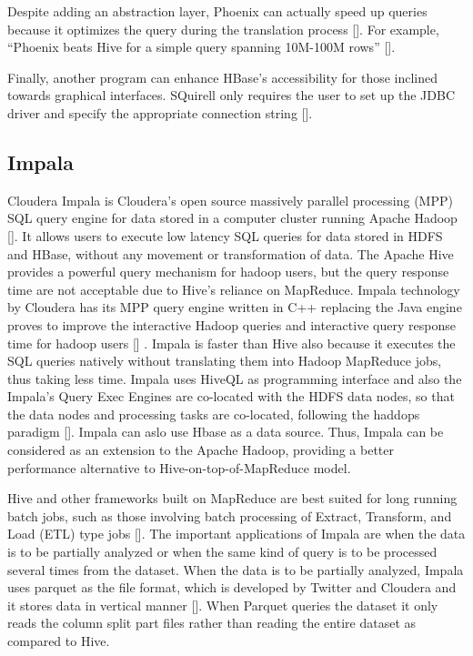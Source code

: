 Despite adding an abstraction layer, Phoenix can actually speed up
queries because it optimizes the query during the translation
process [\cite{www-phoenix-cloudera}]. For example, ``Phoenix beats Hive
for a simple query spanning 10M-100M rows'' [\cite{www-phoenix-infoq}].

Finally, another program can enhance HBase's accessibility for those
inclined towards graphical interfaces.  SQuirell only requires the
user to set up the JDBC driver and specify the appropriate connection
string [\cite{www-phoenix-bighadoop}].



\subsection{Impala}

Cloudera Impala is Cloudera's open source massively parallel
processing (MPP) SQL query engine for data stored in a computer
cluster running Apache Hadoop [\cite{www-impala-cloudera}]. It allows
users to execute low latency SQL queries for data stored in HDFS and
HBase, without any movement or transformation of data. The Apache Hive
provides a powerful query mechanism for hadoop users, but the query
response time are not acceptable due to Hive's reliance on
MapReduce. Impala technology by Cloudera has its MPP query engine
written in C++ replacing the Java engine proves to improve the
interactive Hadoop queries and interactive query response time for
hadoop users [\cite{www-impala-dummies}] . Impala is faster than Hive
also because it executes the SQL queries natively without translating
them into Hadoop MapReduce jobs, thus taking less time. Impala uses
HiveQL as programming interface and also the Impala's Query Exec
Engines are co-located with the HDFS data nodes, so that the data
nodes and processing tasks are co-located, following the haddops
paradigm [\cite{www-impala-dummies}].  Impala can aslo use Hbase as a
data source. Thus, Impala can be considered as an extension to the
Apache Hadoop, providing a better performance alternative to
Hive-on-top-of-MapReduce model.

Hive and other frameworks built on MapReduce are best suited for long
running batch jobs, such as those involving batch processing of
Extract, Transform, and Load (ETL) type
jobs [\cite{www-impala-cloudera}].  The important applications of Impala
are when the data is to be partially analyzed or when the same kind of
query is to be processed several times from the dataset. When the data
is to be partially analyzed, Impala uses parquet as the file format,
which is developed by Twitter and Cloudera and it stores data in
vertical manner [\cite{www-impala-beginner}]. When Parquet queries the
dataset it only reads the column split part files rather than reading
the entire dataset as compared to Hive.
     
